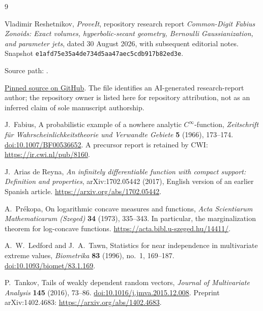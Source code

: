 \documentclass[11pt,a4paper]{article}
\theoremstyle{definition}
\theoremstyle{remark}
\newcommand{\repoSHA}{\texttt{e1afd75e35a4de734d5aa47aec5cdb917b82ed3e}}
\numberwithin{equation}{section}
\begin{document}
\clearpage
\begin{thebibliography}{9}

Vladimir Reshetnikov, \emph{ProveIt}, repository research report
\emph{Common-Digit Fabius Zonoids: Exact volumes, hyperbolic-secant geometry,
Bernoulli Gaussianization, and parameter jets}, dated 30 August 2026,
with subsequent editorial notes. Snapshot \repoSHA.
{\raggedright Source path:
.\par}
\href{https://github.com/VladimirReshetnikov/ProveIt/blob/e1afd75e35a4de734d5aa47aec5cdb917b82ed3e/Analysis/FabiusFunction/docs/semi-formalized-research-frontiers/drafts/representations/common_digit_fabius_zonoids_frontier_report/common_digit_fabius_zonoids.tex}{Pinned source on GitHub}.
The file identifies an AI-generated research-report author; the repository
owner is listed here for repository attribution, not as an inferred claim
of sole manuscript authorship.

J.~Fabius,
A probabilistic example of a nowhere analytic $C^\infty$-function,
\emph{Zeitschrift f\"ur Wahrscheinlichkeitstheorie und Verwandte Gebiete}
\textbf{5} (1966), 173--174.
\href{https://doi.org/10.1007/BF00536652}{doi:10.1007/BF00536652}.
A precursor report is retained by CWI:
\url{https://ir.cwi.nl/pub/8160}.

J.~Arias de Reyna,
\emph{An infinitely differentiable function with compact support:
Definition and properties}, arXiv:1702.05442 (2017), English version of
an earlier Spanish article.
\url{https://arxiv.org/abs/1702.05442}.

A.~Pr\'ekopa,
On logarithmic concave measures and functions,
\emph{Acta Scientiarum Mathematicarum (Szeged)} \textbf{34} (1973),
335--343. In particular, the marginalization theorem for log-concave
functions.
\url{https://acta.bibl.u-szeged.hu/14411/}.

A.~W.~Ledford and J.~A.~Tawn,
Statistics for near independence in multivariate extreme values,
\emph{Biometrika} \textbf{83} (1996), no.~1, 169--187.
\href{https://doi.org/10.1093/biomet/83.1.169}{doi:10.1093/biomet/83.1.169}.

P.~Tankov,
Tails of weakly dependent random vectors,
\emph{Journal of Multivariate Analysis} \textbf{145} (2016), 73--86.
\href{https://doi.org/10.1016/j.jmva.2015.12.008}{doi:10.1016/j.jmva.2015.12.008}.
Preprint arXiv:1402.4683:
\url{https://arxiv.org/abs/1402.4683}.

\end{thebibliography}
\end{document}
